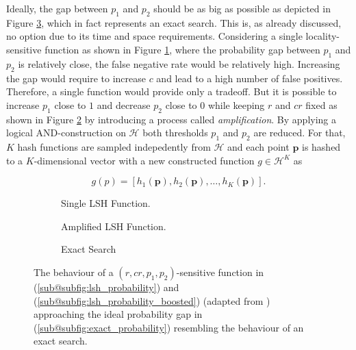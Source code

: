 \documentclass[../../../main.tex]{subfiles}
\begin{document}
Ideally, the gap between $p_1$ and $p_2$ should be as big as possible as depicted in Figure \ref{subfig:exact_probability}, which in fact represents an exact search. This is, as already discussed, no option due to its time and space requirements. Considering a single locality-sensitive function as shown in Figure \ref{subfig:lsh_probability}, where the probability gap between $p_1$ and $p_2$ is relatively close, the false negative rate would be relatively high. Increasing the gap would require to increase $c$ and lead to a high number of false positives. Therefore, a single function would provide only a tradeoff. But it is possible to increase $p_1$ close to $1$ and decrease $p_2$ close to $0$ while keeping $r$ and $cr$ fixed as shown in Figure \ref{subfig:lsh_probability_boosted} by introducing a process called \textit{amplification}. By applying a logical AND-construction on $\mathcal{H}$ both thresholds $p_1$ and $p_2$ are reduced. For that, $K$ hash functions are sampled indepedently from $\mathcal{H}$ and each point $\bm{p}$ is hashed to a $K$-dimensional vector with a new constructed function $g \in \mathcal{H}^K$ as

\begin{equation}\label{eq:or_construction}
    g(p) = [h_1(\bm{p}), h_2(\bm{p}), \dots, h_K(\bm{p})].
\end{equation}

\begin{figure}
    \centering
    \begin{subfigure}[b]{0.3\textwidth}
        \centering
        
        \caption{Single LSH Function.}
        \label{subfig:lsh_probability}
    \end{subfigure}
    \hfill
    \begin{subfigure}[b]{0.3\textwidth}
        \centering
        
        \caption{Amplified LSH Function.}
        \label{subfig:lsh_probability_boosted}
        \end{subfigure}
        \hfill
        \begin{subfigure}[b]{0.3\textwidth}
            \centering
            
            \caption{Exact Search}
            \label{subfig:exact_probability}
    \end{subfigure}
    \caption{The behaviour of a $(r, cr, p_1, p_2)$-sensitive function in (\ref{sub@subfig:lsh_probability}) and (\ref{sub@subfig:lsh_probability_boosted}) (adapted from \cite[100]{leskovec_rajaraman_ullman_2014}) approaching the ideal probability gap in (\ref{sub@subfig:exact_probability}) resembling the behaviour of an exact search.}
    \label{fig:lsh_probability}
\end{figure}
   
\end{document}
